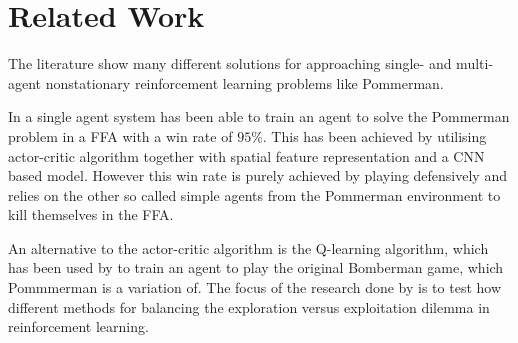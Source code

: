 \section{Related Work}
\label{sec:relatedwork}


The literature show many different solutions for approaching single- and multi-agent nonstationary reinforcement learning problems like Pommerman.

In a single agent system has \cite{rwightman} been able to train an agent to solve the Pommerman problem in a FFA with a win rate of $95\%$. This has been achieved by utilising actor-critic algorithm together with spatial feature representation and a CNN based model. However this win rate is purely achieved by playing defensively and relies on the other so called simple agents from the Pommerman environment to kill themselves in the FFA.

An alternative to the actor-critic algorithm is the Q-learning algorithm, which has been used by \cite{tokic2010adaptive} to train an agent to play the original Bomberman game, which Pommmerman is a variation of. The focus of the research done by \cite{tokic2010adaptive} is to test how different methods for balancing the exploration versus exploitation dilemma in reinforcement learning.


